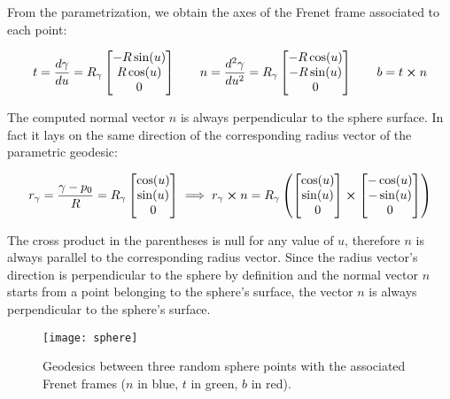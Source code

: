 From the parametrization, we obtain the axes of the Frenet frame associated to each point:

\begin{equation*}
t = \frac{d\gamma}{du} = R_\gamma\begin{bmatrix}
-R\sin(u)\\ R\cos(u)\\ 0
\end{bmatrix}\;\;\;\;\;\;\;n = \frac{d^2\gamma}{du^2} = R_\gamma\begin{bmatrix}
-R\cos(u)\\ -R\sin(u)\\ 0
\end{bmatrix}\;\;\;\;\;\;\;b = t\cross n
\end{equation*}

The computed normal vector $n$ is always perpendicular to the sphere surface. In fact it lays on the same direction of the corresponding radius vector of the parametric geodesic:

\begin{equation*}
r_\gamma = \frac{\gamma-p_0}{R}= R_\gamma\begin{bmatrix}
\cos(u)\\ \sin(u)\\ 0
\end{bmatrix}\implies r_\gamma\cross n = R_\gamma\left(\begin{bmatrix}
\cos(u)\\ \sin(u)\\ 0
\end{bmatrix}\cross\begin{bmatrix}
-\cos(u)\\ -\sin(u)\\ 0
\end{bmatrix}\right)
\end{equation*}

The cross product in the parentheses is null for any value of $u$, therefore $n$ is always parallel to the corresponding radius vector. Since the radius vector's direction is perpendicular to the sphere by definition and the normal vector $n$ starts from a point belonging to the sphere's surface, the vector $n$ is always perpendicular to the sphere's surface.

\begin{figure}[h]
\centering
\texttt{[image: sphere]}
\caption{Geodesics between three random sphere points with the associated Frenet frames ($n$ in blue, $t$ in green, $b$ in red).}
\end{figure}